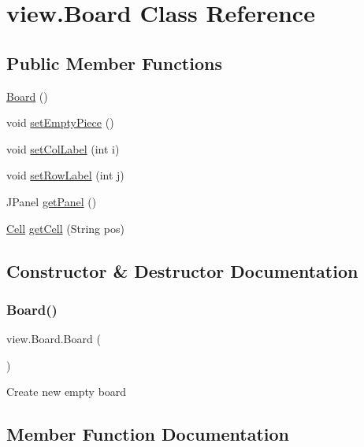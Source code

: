 \hypertarget{classview_1_1_board}{}\section{view.\+Board Class Reference}
\label{classview_1_1_board}
\subsection*{Public Member Functions}
\begin{DoxyCompactItemize}
\item 
\mbox{\hyperlink{classview_1_1_board_a3d86663a75e8573a1610716446facb59}{Board}} ()
\item 
void \mbox{\hyperlink{classview_1_1_board_a2c7d05a8fa6a3ee5bc8fc40ccdb0b487}{set\+Empty\+Piece}} ()
\item 
void \mbox{\hyperlink{classview_1_1_board_a485826c9e2feb7e266fc45d0dcb3c7d0}{set\+Col\+Label}} (int i)
\item 
void \mbox{\hyperlink{classview_1_1_board_aaf1c1066d7df098ab7b7a4e1d00beb25}{set\+Row\+Label}} (int j)
\item 
J\+Panel \mbox{\hyperlink{classview_1_1_board_a20b01941d419f3a415ebf1e42bbfd84d}{get\+Panel}} ()
\item 
\mbox{\hyperlink{classview_1_1_cell}{Cell}} \mbox{\hyperlink{classview_1_1_board_a1fe3b0adcc34345c652ff3055b308f6b}{get\+Cell}} (String pos)
\end{DoxyCompactItemize}


\subsection{Constructor \& Destructor Documentation}
\mbox{\label{classview_1_1_board_a3d86663a75e8573a1610716446facb59}} 
\subsubsection{\texorpdfstring{Board()}{Board()}}
{\footnotesize\ttfamily view.\+Board.\+Board (\begin{DoxyParamCaption}{ }\end{DoxyParamCaption})\hspace{0.3cm}{\ttfamily [inline]}}

Create new empty board 

\subsection{Member Function Documentation}
\mbox{\label{classview_1_1_board_a1fe3b0adcc34345c652ff3055b308f6b}} 
